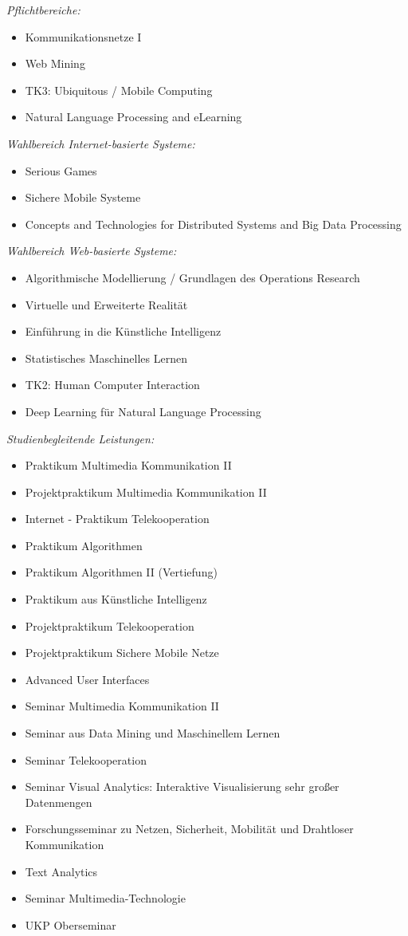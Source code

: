 {\textit{Pflichtbereiche:}
\begin{itemize}[noitemsep]
  \item Kommunikationsnetze I
  \item Web Mining
  \item TK3: Ubiquitous / Mobile Computing
  \item Natural Language Processing and eLearning
\end{itemize}
\textit{Wahlbereich Internet-basierte Systeme:}
\begin{itemize}[noitemsep]
  \item Serious Games
  \item Sichere Mobile Systeme
  \item Concepts and Technologies for Distributed Systems and Big Data Processing
\end{itemize}
\textit{Wahlbereich Web-basierte Systeme:}
\begin{itemize}[noitemsep]
  \item Algorithmische Modellierung / Grundlagen des Operations Research
  \item Virtuelle und Erweiterte Realität
  \item Einführung in die Künstliche Intelligenz
  \item Statistisches Maschinelles Lernen
  \item TK2: Human Computer Interaction
  \item Deep Learning für Natural Language Processing
\end{itemize}
\textit{Studienbegleitende Leistungen:}
\begin{itemize}[noitemsep]
  \item Praktikum Multimedia Kommunikation II
  \item Projektpraktikum Multimedia Kommunikation II
  \item Internet - Praktikum Telekooperation
  \item Praktikum Algorithmen
  \item Praktikum Algorithmen II (Vertiefung)
  \item Praktikum aus Künstliche Intelligenz
  \item Projektpraktikum Telekooperation
  \item Projektpraktikum Sichere Mobile Netze
  \item Advanced User Interfaces
  \item Seminar Multimedia Kommunikation II
  \item Seminar aus Data Mining und Maschinellem Lernen
  \item Seminar Telekooperation
  \item Seminar Visual Analytics: Interaktive Visualisierung sehr großer Datenmengen
  \item Forschungsseminar zu Netzen, Sicherheit, Mobilität und Drahtloser Kommunikation
  \item Text Analytics
  \item Seminar Multimedia-Technologie
  \item UKP Oberseminar
\end{itemize}

}
